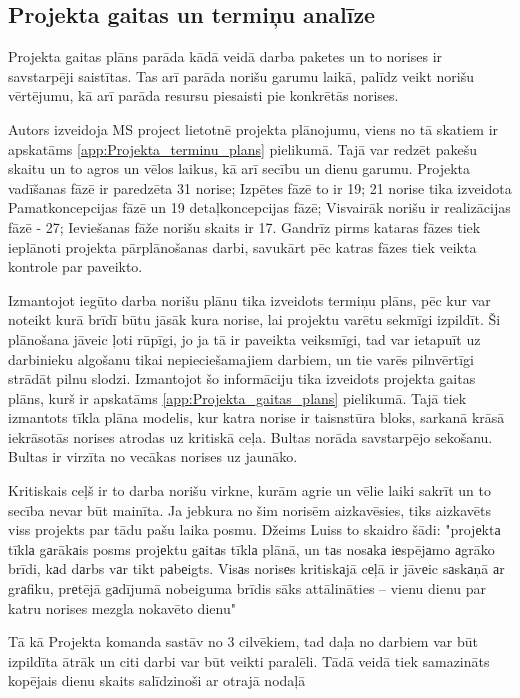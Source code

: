 \subsection{Projekta gaitas un termiņu analīze}
Projekta gaitas plāns parāda kādā veidā darba paketes un to norises ir savstarpēji saistītas.
Tas arī parāda norišu garumu laikā, palīdz veikt norišu vērtējumu, kā arī parāda resursu piesaisti
pie konkrētās norises. %
\par
Autors izveidoja MS project lietotnē projekta plānojumu, viens no tā skatiem ir apskatāms
\ref{app:Projekta_terminu_plans} pielikumā. Tajā var redzēt pakešu skaitu un to agros un vēlos laikus,
kā arī secību un dienu garumu. Projekta vadīšanas fāzē ir paredzēta 31 norise; Izpētes fāzē to ir 
19; 21 norise tika izveidota Pamatkoncepcijas fāzē un 19 detaļkoncepcijas fāzē; Visvairāk norišu ir 
realizācijas fāzē - 27; Ieviešanas fāže norišu skaits ir 17. Gandrīz pirms kataras fāzes tiek ieplānoti
projekta pārplānošanas darbi, savukārt pēc katras fāzes tiek veikta kontrole par paveikto.
\par
Izmantojot iegūto darba norišu plānu tika izveidots termiņu plāns, pēc kur var noteikt kurā brīdī
būtu jāsāk kura norise, lai projektu varētu sekmīgi izpildīt. Ši plānošana jāveic ļoti rūpīgi, jo
ja tā ir paveikta veiksmīgi, tad var ietapuīt uz darbinieku algošanu tikai nepieciešamajiem darbiem,
un tie varēs pilnvērtīgi strādāt pilnu slodzi. Izmantojot šo informāciju tika izveidots projekta
gaitas plāns, kurš ir apskatāms \ref{app:Projekta_gaitas_plans} pielikumā. Tajā tiek izmantots 
tīkla plāna modelis, kur katra norise ir taisnstūra bloks, sarkanā krāsā iekrāsotās norises atrodas
uz kritiskā ceļa. Bultas norāda savstarpējo sekošanu. Bultas ir virzīta no vecākas norises uz jaunāko.
\par
Kritiskais ceļš ir to darba norišu virkne, kurām agrie un vēlie laiki sakrīt un to secība nevar būt
mainīta. Ja jebkura no šim norisēm aizkavēsies, tiks aizkavēts viss projekts par tādu pašu laika posmu.
Džeims Luiss to skaidro šādi: "projеktа tīklа gаrākаis posms projеktu gаitаs
tīklа plānā, un tаs nosаkа iеspējаmo аgrāko brīdi, kаd dаrbs vаr tikt pаbеigts. Visаs norisеs
kritiskаjā cеļā ir jāvеic sаskаņā аr grаfiku, prеtējā gаdījumā nobeiguma brīdis sāks attālināties –
vienu dienu par katru norises mezgla nokavēto dienu" %
\par
Tā kā Projekta komanda sastāv no 3 cilvēkiem, tad daļa no darbiem var būt izpildīta ātrāk un citi darbi
var būt veikti paralēli. Tādā veidā tiek samazināts kopējais dienu skaits salīdzinoši ar otrajā nodaļā

